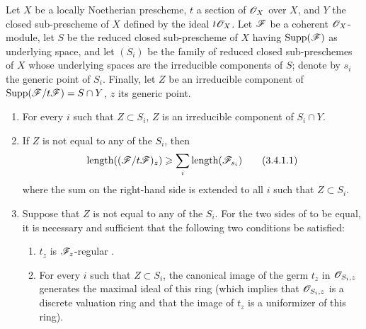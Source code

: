 \begin{proposition}[3.4.1]
\label{IV.3.4.1}
Let $X$ be a locally Noetherian prescheme, $t$ a section of $\mathscr{O}_X$ over $X$, and $Y$ the closed sub-prescheme of $X$ defined by the ideal $t\mathscr{O}_X$.
Let $\mathscr{F}$ be a coherent $\mathscr{O}_X$-module, let $S$ be the reduced closed sub-prescheme of $X$ having $\operatorname{Supp}(\mathscr{F})$ as underlying space, and let $(S_i)$ be the family of reduced closed sub-preschemes of $X$ whose underlying spaces are the irreducible components of $S$; denote by $s_i$ the generic point of $S_i$.
Finally, let $Z$ be an irreducible component of $\operatorname{Supp}(\mathscr{F}/t\mathscr{F})=S\cap Y$, $z$ its generic point.
\begin{enumerate}
  \item[\emph{(i)}] For every $i$ such that $Z\subset S_i$, $Z$ is an irreducible component of $S_i\cap Y$.
  \item[\emph{(ii)}] If $Z$ is not equal to any of the $S_i$, then
\[
\label{IV.3.4.1.1}
\operatorname{length}((\mathscr{F}/t\mathscr{F})_z)\geqslant\sum_i\operatorname{length}(\mathscr{F}_{s_i})
\tag{3.4.1.1}
\]
where the sum on the right-hand side is extended to all $i$ such that $Z\subset S_i$.
  \item[\emph{(iii)}] Suppose that $Z$ is not equal to any of the $S_i$.
  For the two sides of  to be equal, it is necessary and sufficient that the following two conditions be satisfied:
  \begin{enumerate}
    \item[\emph{$\alpha$)}] $t_z$ is $\mathscr{F}_z$-regular .
    \item[\emph{$\beta$)}] For every $i$ such that $Z\subset S_i$, the canonical image of the germ $t_z$ in $\mathscr{O}_{S_i,z}$ generates the maximal ideal of this ring (which implies that $\mathscr{O}_{S_i,z}$ is a discrete valuation ring and that the image of $t_z$ is a uniformizer of this ring).
  \end{enumerate}
\end{enumerate}
\end{proposition}

